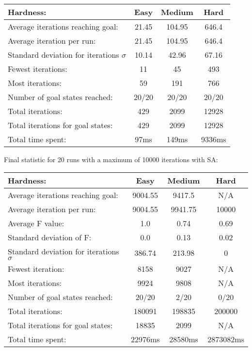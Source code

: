 \documentclass[12pt, a4paper]{article}
\begin{document}
\begin{center}
  \begin{tabular}{| l | c c c|}
    \hline
    Hardness: &\textbf{Easy} & \textbf{Medium} & \textbf{Hard} \\ \hline
    Average iterations reaching goal: & 21.45& 104.95& 646.4\\
    Average iteration per run:  & 21.45 & 104.95 &  646.4\\
    Standard deviation for iterations $\sigma$ & 10.14 & 42.96 & 67.16\\
    Fewest iterations: & 11 & 45& 493\\ 
    Most iterations: & 59 & 191& 766\\ 
    Number of goal states reached: & 20/20 & 20/20 & 20/20\\
    Total iterations: & 429 & 2099& 12928\\
    Total iterations for goal states: & 429 & 2099& 12928\\
    Total time spent: & 97ms& 149ms & 9336ms\\
    \hline
  \end{tabular}
\end{center}
Final statistic for 20 runs with a maximum of 10000 iterations with SA: \\
\begin{center}
  \begin{tabular}{| l | c c c|}
    \hline
    Hardness: &\textbf{Easy} & \textbf{Medium} & \textbf{Hard} \\ \hline
    Average iterations reaching goal: & 9004.55& 9417.5 & N/A\\
    Average iteration per run:  & 9004.55 & 9941.75 &  10000\\
    Average F value: & 1.0 & 0.74 & 0.69\\
    Standard deviation of F: & 0.0 & 0.13& 0.02\\
    Standard deviation for iterations $\sigma$ & 386.74 & 213.98 & 0\\
    Fewest iteration: & 8158 & 9027& N/A\\ 
    Most iterations: & 9924 & 9808& N/A\\ 
    Number of goal states reached: & 20/20 & 2/20 & 0/20\\
    Total iterations: & 180091 & 198835& 200000\\
    Total iterations for goal states: & 18835 & 2099& N/A\\
    Total time spent: & 22976ms & 28580ms & 2873082ms\\
    \hline
  \end{tabular}
\end{center}
\end{document}
